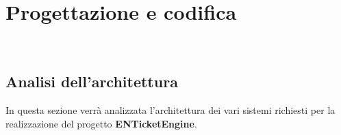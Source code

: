 
\chapter{Progettazione e codifica}
\label{cap:progettazione-codifica}

\\


\section{Analisi dell'architettura}
In questa sezione verrà analizzata l'architettura dei vari sistemi richiesti per la realizzazione del progetto \textbf{ENTicketEngine}.\\

